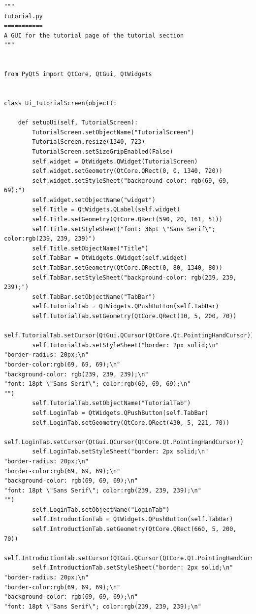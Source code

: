 \documentclass[12pt]{article}
\begin{document}
\begin{lstlisting}
"""
tutorial.py
===========
A GUI for the tutorial page of the tutorial section
"""


from PyQt5 import QtCore, QtGui, QtWidgets


class Ui_TutorialScreen(object):

    def setupUi(self, TutorialScreen):
        TutorialScreen.setObjectName("TutorialScreen")
        TutorialScreen.resize(1340, 723)
        TutorialScreen.setSizeGripEnabled(False)
        self.widget = QtWidgets.QWidget(TutorialScreen)
        self.widget.setGeometry(QtCore.QRect(0, 0, 1340, 720))
        self.widget.setStyleSheet("background-color: rgb(69, 69, 69);")
        self.widget.setObjectName("widget")
        self.Title = QtWidgets.QLabel(self.widget)
        self.Title.setGeometry(QtCore.QRect(590, 20, 161, 51))
        self.Title.setStyleSheet("font: 36pt \"Sans Serif\"; color:rgb(239, 239, 239)")
        self.Title.setObjectName("Title")
        self.TabBar = QtWidgets.QWidget(self.widget)
        self.TabBar.setGeometry(QtCore.QRect(0, 80, 1340, 80))
        self.TabBar.setStyleSheet("background-color: rgb(239, 239, 239);")
        self.TabBar.setObjectName("TabBar")
        self.TutorialTab = QtWidgets.QPushButton(self.TabBar)
        self.TutorialTab.setGeometry(QtCore.QRect(10, 5, 200, 70))
        self.TutorialTab.setCursor(QtGui.QCursor(QtCore.Qt.PointingHandCursor))
        self.TutorialTab.setStyleSheet("border: 2px solid;\n"
"border-radius: 20px;\n"
"border-color:rgb(69, 69, 69);\n"
"background-color: rgb(239, 239, 239);\n"
"font: 18pt \"Sans Serif\"; color:rgb(69, 69, 69);\n"
"")
        self.TutorialTab.setObjectName("TutorialTab")
        self.LoginTab = QtWidgets.QPushButton(self.TabBar)
        self.LoginTab.setGeometry(QtCore.QRect(430, 5, 221, 70))
        self.LoginTab.setCursor(QtGui.QCursor(QtCore.Qt.PointingHandCursor))
        self.LoginTab.setStyleSheet("border: 2px solid;\n"
"border-radius: 20px;\n"
"border-color:rgb(69, 69, 69);\n"
"background-color: rgb(69, 69, 69);\n"
"font: 18pt \"Sans Serif\"; color:rgb(239, 239, 239);\n"
"")
        self.LoginTab.setObjectName("LoginTab")
        self.IntroductionTab = QtWidgets.QPushButton(self.TabBar)
        self.IntroductionTab.setGeometry(QtCore.QRect(660, 5, 200, 70))
        self.IntroductionTab.setCursor(QtGui.QCursor(QtCore.Qt.PointingHandCursor))
        self.IntroductionTab.setStyleSheet("border: 2px solid;\n"
"border-radius: 20px;\n"
"border-color:rgb(69, 69, 69);\n"
"background-color: rgb(69, 69, 69);\n"
"font: 18pt \"Sans Serif\"; color:rgb(239, 239, 239);\n"

\end{lstlisting}
\end{document}
